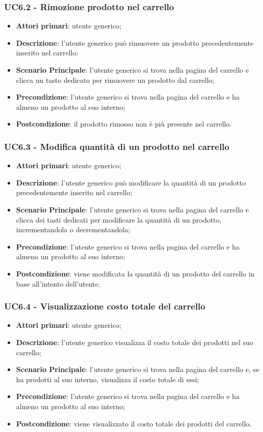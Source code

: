 \subsubsection{UC6.2 - Rimozione prodotto nel carrello}
\begin{itemize}
\item \textbf{Attori primari}: utente generico;
\item \textbf{Descrizione}: l'utente generico può rimuovere un prodotto precedentemente inserito nel carrello;
\item \textbf{Scenario Principale}: l'utente generico si trova nella pagina del carrello e clicca un tasto dedicato per rimuovere un prodotto dal carrello;
\item \textbf{Precondizione}: l'utente generico si trova nella pagina del carrello e ha almeno un prodotto al suo interno;
\item \textbf{Postcondizione}: il prodotto rimosso non è più presente nel carrello.
\end{itemize}

\subsubsection{UC6.3 - Modifica quantità di un prodotto nel carrello}
\begin{itemize}
\item \textbf{Attori primari}: utente generico;
\item \textbf{Descrizione}: l'utente generico può modificare la quantità di un prodotto precedentemente inserito nel carrello;
\item \textbf{Scenario Principale}: l'utente generico si trova nella pagina del carrello e clicca dei tasti dedicati per modificare la quantità di un prodotto, incrementandola o decrementandola;
\item \textbf{Precondizione}: l'utente generico si trova nella pagina del carrello e ha almeno un prodotto al suo interno;
\item \textbf{Postcondizione}: viene modificata la quantità di un prodotto del carrello in base all'intento dell'utente.
\end{itemize}

\subsubsection{UC6.4 - Visualizzazione costo totale del carrello}
\begin{itemize}
\item \textbf{Attori primari}: utente generico;
\item \textbf{Descrizione}: l'utente generico visualizza il costo totale dei prodotti nel suo carrello;
\item \textbf{Scenario Principale}: l'utente generico si trova nella pagina del carrello e, se ha prodotti al suo interno, visualizza il costo totale di essi;
\item \textbf{Precondizione}: l'utente generico si trova nella pagina del carrello e ha almeno un prodotto al suo interno;
\item \textbf{Postcondizione}: viene visualizzato il costo totale dei prodotti del carrello.
\end{itemize}

